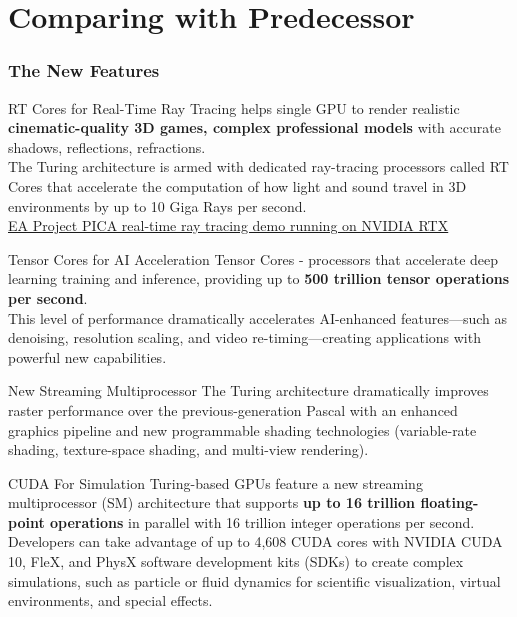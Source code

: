 \documentclass[xcolor=x11names,table]{beamer}
\begin{document}
\begin{frame}[allowframebreaks]
    \end{frame}


\section{Comparing with Predecessor}
    \begin{frame}[allowframebreaks]
    \frametitle{The New Features}
        \begin{block}{RT Cores for Real-Time Ray Tracing}
        {\small helps single GPU to render realistic \textbf{cinematic-quality 3D games, complex professional models} with accurate shadows, reflections, refractions.
        \\ The Turing architecture is armed with dedicated ray-tracing processors called RT Cores that accelerate the computation of how light and sound travel in 3D environments by up to 10 Giga Rays per second.
        \\ \href{https://www.youtube.com/watch?v=LXo0WdlELJk}{EA Project PICA real-time ray tracing demo running on NVIDIA RTX}}
        \end{block}
        
        \begin{block}{Tensor Cores for AI Acceleration}
        {\small Tensor Cores - processors that accelerate deep learning training and inference, providing up to \textbf{500 trillion tensor operations per second}.
        \\ This level of performance dramatically accelerates AI-enhanced features—such as denoising, resolution scaling, and video re-timing—creating applications with powerful new capabilities.}
        \end{block}
        
        \begin{block}{New Streaming Multiprocessor}
        {\small The Turing architecture dramatically improves raster performance over the previous-generation Pascal with an enhanced graphics pipeline and new programmable shading technologies (variable-rate shading, texture-space shading, and multi-view rendering).
        }
        \end{block}
        
        \begin{block}{CUDA For Simulation}
        {\small Turing-based GPUs feature a new streaming multiprocessor (SM) architecture that supports \textbf{up to 16 trillion floating-point operations} in parallel with 16 trillion integer operations per second. 
        \\ Developers can take advantage of up to 4,608 CUDA cores with NVIDIA CUDA 10, FleX, and PhysX software development kits (SDKs) to create complex simulations, such as particle or fluid dynamics for scientific visualization, virtual environments, and special effects.}
        \end{block}
    \end{frame}
\end{document}
